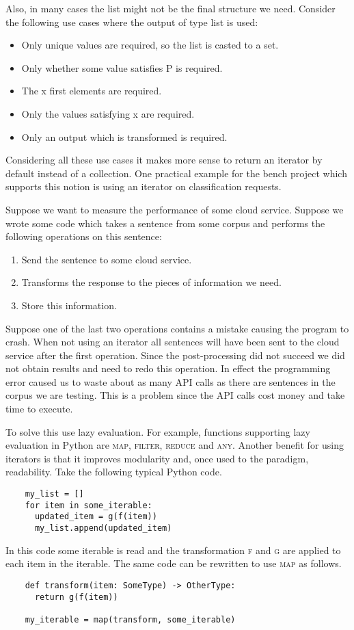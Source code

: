 Also, in many cases the list might not be the final structure we need.
Consider the following use cases where the output of type list is used:
\begin{itemize}
    \item Only unique values are required, so the list is casted to a set.
    \item Only whether some value satisfies P is required.
    \item The x first elements are required.
    \item Only the values satisfying x are required.
    \item Only an output which is transformed is required.
\end{itemize}

Considering all these use cases it makes more sense to return an iterator by default instead of a collection.
One practical example for the bench project which supports this notion is using an iterator on classification requests.

Suppose we want to measure the performance of some cloud service.
Suppose we wrote some code which takes a sentence from some corpus and performs the following operations on this sentence:
\begin{enumerate}
    \item Send the sentence to some cloud service.
    \item Transforms the response to the pieces of information we need.
    \item Store this information.
\end{enumerate}
Suppose one of the last two operations contains a mistake causing the program to crash.
When not using an iterator all sentences will have been sent to the cloud service after the first operation.
Since the post-processing did not succeed we did not obtain results and need to redo this operation.
In effect the programming error caused us to waste about as many API calls as there are sentences in the corpus we are testing.
This is a problem since the API calls cost money and take time to execute.

To solve this use lazy evaluation.
For example, functions supporting lazy evaluation in Python are \textsc{map}, \textsc{filter}, \textsc{reduce} and \textsc{any}.
Another benefit for using iterators is that it improves modularity and, once used to the paradigm, readability.
Take the following typical Python code.

\begin{verbatim}
    my_list = []
    for item in some_iterable:
      updated_item = g(f(item))
      my_list.append(updated_item)
\end{verbatim}

In this code some iterable is read and the transformation \textsc{f} and \textsc{g} are applied to each item in the iterable.
The same code can be rewritten to use \textsc{map} as follows.

\begin{verbatim}
    def transform(item: SomeType) -> OtherType:
      return g(f(item))

    my_iterable = map(transform, some_iterable)
\end{verbatim}
